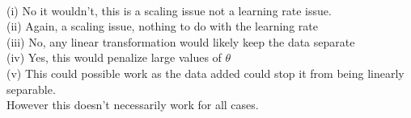 \begin{answer}
    \\(i) No it wouldn't, this is a scaling issue not a learning rate issue.\\
    (ii) Again, a scaling issue, nothing to do with the learning rate\\
    (iii) No, any linear transformation would likely keep the data separate \\
    (iv) Yes, this would penalize large values of $\theta$\\
    (v) This could possible work as the data added could stop it from being linearly separable.\\
    However this doesn't necessarily work for all cases.
\end{answer}
